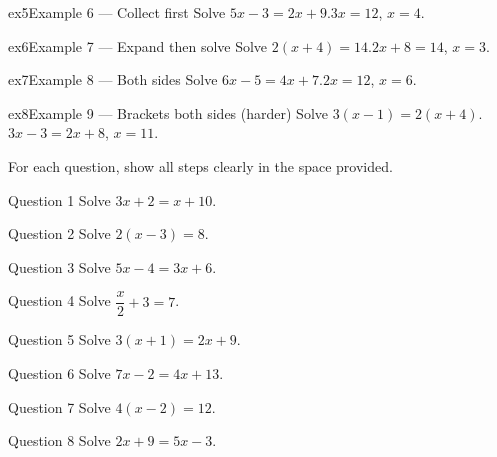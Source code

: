 \documentclass[11pt]{article}
\begin{document}
\begin{example}{ex5}{Example 6 --- Collect first}
Solve $5x-3=2x+9$.\soln $3x=12$, $x=4$.
\end{example}

\begin{example}{ex6}{Example 7 --- Expand then solve}
Solve $2(x+4)=14$.\soln $2x+8=14$, $x=3$.
\end{example}

\begin{example}{ex7}{Example 8 --- Both sides}
Solve $6x-5=4x+7$.\soln $2x=12$, $x=6$.
\end{example}

\begin{example}{ex8}{Example 9 --- Brackets both sides (harder)}
Solve $3(x-1)=2(x+4)$.\soln $3x-3=2x+8$, $x=11$.
\end{example}

\clearpage
{}
For each question, show all steps clearly in the space provided.

\begin{qbox}{Question 1}
Solve $3x+2=x+10$.\workspace{2.2cm}
\end{qbox}

\begin{qbox}{Question 2}
Solve $2(x-3)=8$.\workspace{2.0cm}
\end{qbox}

\begin{qbox}{Question 3}
Solve $5x-4=3x+6$.\workspace{2.2cm}
\end{qbox}

\begin{qbox}{Question 4}
Solve $\dfrac{x}{2}+3=7$.\workspace{2.0cm}
\end{qbox}

\begin{qbox}{Question 5}
Solve $3(x+1)=2x+9$.\workspace{2.2cm}
\end{qbox}

\begin{qbox}{Question 6}
Solve $7x-2=4x+13$.\workspace{2.2cm}
\end{qbox}

\begin{qbox}{Question 7}
Solve $4(x-2)=12$.\workspace{2.0cm}
\end{qbox}

\begin{qbox}{Question 8}
Solve $2x+9=5x-3$.\workspace{2.2cm}
\end{qbox}
\end{document}
